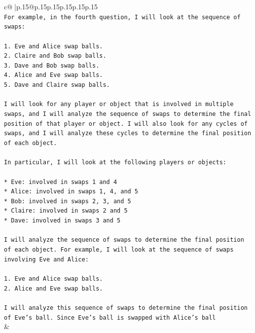 \documentclass{article}
\begin{document}
{\begin{supertabular}{c@{$\;$}|p{.15\linewidth}@{}p{.15\linewidth}p{.15\linewidth}p{.15\linewidth}p{.15\linewidth}p{.15\linewidth}}
{{{\\ 
\texttt{For example, in the fourth question, I will look at the sequence of swaps:} \\
\\ 
\texttt{1. Eve and Alice swap balls.} \\
\texttt{2. Claire and Bob swap balls.} \\
\texttt{3. Dave and Bob swap balls.} \\
\texttt{4. Alice and Eve swap balls.} \\
\texttt{5. Dave and Claire swap balls.} \\
\\ 
\texttt{I will look for any player or object that is involved in multiple swaps, and I will analyze the sequence of swaps to determine the final position of that player or object. I will also look for any cycles of swaps, and I will analyze these cycles to determine the final position of each object.} \\
\\ 
\texttt{In particular, I will look at the following players or objects:} \\
\\ 
\texttt{* Eve: involved in swaps 1 and 4} \\
\texttt{* Alice: involved in swaps 1, 4, and 5} \\
\texttt{* Bob: involved in swaps 2, 3, and 5} \\
\texttt{* Claire: involved in swaps 2 and 5} \\
\texttt{* Dave: involved in swaps 3 and 5} \\
\\ 
\texttt{I will analyze the sequence of swaps to determine the final position of each object. For example, I will look at the sequence of swaps involving Eve and Alice:} \\
\\ 
\texttt{1. Eve and Alice swap balls.} \\
\texttt{2. Alice and Eve swap balls.} \\
\\ 
\texttt{I will analyze this sequence of swaps to determine the final position of Eve's ball. Since Eve's ball is swapped with Alice's ball} \\
            }
        }
    }
    & \\ \\

\end{supertabular}
}
\end{document}
